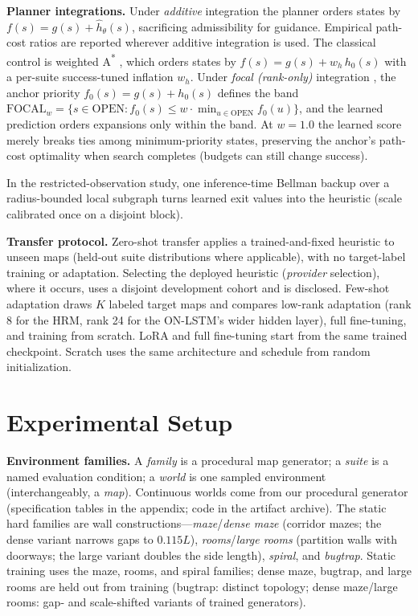 \documentclass[letterpaper]{article} %
\begin{document}
\textbf{Planner integrations.} Under \emph{additive} integration the planner orders states by $f(s) = g(s) + \hat h_\theta(s)$, sacrificing admissibility for guidance. Empirical path-cost ratios are reported wherever additive integration is used. The classical control is weighted A\textsuperscript{*} \citep{pohl1970}, which orders states by $f(s) = g(s) + w_h\, h_0(s)$ with a per-suite success-tuned inflation $w_h$. Under \emph{focal (rank-only)} integration \citep{pohl1970,pearl1982semiadmissible}, the anchor priority $f_0(s) = g(s) + h_0(s)$ defines the band $\mathrm{FOCAL}_w = \{ s \in \mathrm{OPEN} : f_0(s) \leq w \cdot \min_{u \in \mathrm{OPEN}} f_0(u) \}$, and the learned prediction orders expansions only within the band. At $w{=}1.0$ the learned score merely breaks ties among minimum-priority states, preserving the anchor's path-cost optimality when search completes (budgets can still change success).

In the restricted-observation study, one inference-time Bellman backup over a radius-bounded local subgraph turns learned exit values into the heuristic (scale calibrated once on a disjoint block).

\textbf{Transfer protocol.} Zero-shot transfer applies a trained-and-fixed heuristic to unseen maps (held-out suite distributions where applicable), with no target-label training or adaptation. Selecting the deployed heuristic (\emph{provider} selection), where it occurs, uses a disjoint development cohort and is disclosed. Few-shot adaptation draws $K$ labeled target maps and compares low-rank adaptation \citep[LoRA;][]{hu2021lora} (rank 8 for the HRM, rank 24 for the ON-LSTM's wider hidden layer), full fine-tuning, and training from scratch. LoRA and full fine-tuning start from the same trained checkpoint. Scratch uses the same architecture and schedule from random initialization.

\section{Experimental Setup}

\textbf{Environment families.} A \emph{family} is a procedural map generator; a \emph{suite} is a named evaluation condition; a \emph{world} is one sampled environment (interchangeably, a \emph{map}). Continuous worlds come from our procedural generator (specification tables in the appendix; code in the artifact archive). The static hard families are wall constructions---\emph{maze}/\emph{dense maze} (corridor mazes; the dense variant narrows gaps to $0.115L$), \emph{rooms}/\emph{large rooms} (partition walls with doorways; the large variant doubles the side length), \emph{spiral}, and \emph{bugtrap}. Static training uses the maze, rooms, and spiral families; dense maze, bugtrap, and large rooms are held out from training (bugtrap: distinct topology; dense maze/large rooms: gap- and scale-shifted variants of trained generators).
\end{document}
